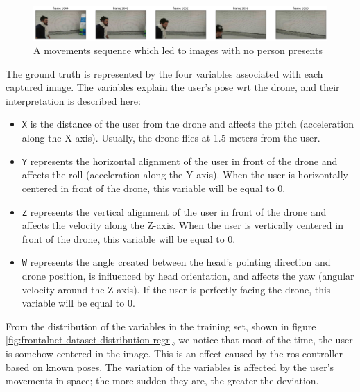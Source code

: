 \begin{figure}[!htb]
\centering
\includegraphics[width=1\textwidth]{"contents/images/03-data-missing"}
\caption[A movements sequence which led to images with no person presents]{A movements sequence which led to images with no person presents}
\label{fig:frontalnet-dataset-missing}
\end{figure}

The ground truth is represented by the four variables associated with each captured image. The variables explain the user's pose \gls{wrt} the drone, and their interpretation is described here:

\begin{itemize}
	\item \texttt{X} is the distance of the user from the drone and affects the pitch (acceleration along the X-axis). Usually, the drone flies at 1.5 meters from the user.
	\item \texttt{Y} represents the horizontal alignment of the user in front of the drone and affects the roll (acceleration along the Y-axis). When the user is horizontally centered in front of the drone, this variable will be equal to 0.
	\item \texttt{Z} represents the vertical alignment of the user in front of the drone and affects the velocity along the Z-axis. When the user is vertically centered in front of the drone, this variable will be equal to 0.
	\item \texttt{W} represents the angle created between the head's pointing direction and drone position, is influenced by head orientation, and affects the yaw (angular velocity around the Z-axis). If the user is perfectly facing the drone, this variable will be equal to 0.
\end{itemize}

From the distribution of the variables in the training set, shown in figure \ref{fig:frontalnet-dataset-distribution-regr}, we notice that most of the time, the user is somehow centered in the image. This is an effect caused by the \gls{ros} controller based on known poses. The variation of the variables is affected by the user's movements in space; the more sudden they are, the greater the deviation.

